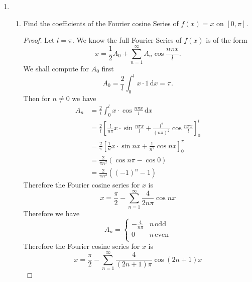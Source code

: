 \documentclass[12pt,letterpaper]{article}
\begin{document}
\begin{enumerate}
\begin{proof}[Solution]
	\end{proof} 
	\newpage
	\item \begin{enumerate}
		\item Find the coefficients of the Fourier cosine Series of $f(x) = x$ on $[0,\pi]$.
		\begin{proof}
			Let $l = \pi$. We know the full Fourier Series of $f(x)$ is of the form
			\[ x = \frac 12 A_0 + \sum_{n = 1}^\infty A_n \cos \frac{n \pi x}{l}.\]
			We shall compute for $A_0$ first
			\[ A_0 = \frac 2l \int_0^l x \cdot 1 \, \mathrm{d}x = \pi.\]
			Then for $n \neq 0$ we have
			\begin{align*}
				A_n &= \frac 2l \int_0^l x \cdot \cos \frac{n \pi x}{l} \, \mathrm{d}x \\
				&= \frac 2l \left[ \frac{l}{n \pi} x \cdot \sin \frac{n \pi x}{l} + \frac{l^2}{(n\pi)^2} \cos \frac{n \pi x}{l}  \right]_0^l \\
				&= \frac 2\pi \left[ \frac 1nx \cdot \sin nx + \frac 1{n^2} \cos nx \right]_0^\pi \\
				&= \frac{2}{\pi n^2}  \left( \cos n \pi - \cos 0 \right) \\
				&= \frac{2}{\pi n^2} ((-1)^n - 1)
			\end{align*}
			Therefore the Fourier cosine series for $x$ is
			\[x = \frac \pi 2  - \sum_{n=1}^{\infty} \frac{4}{2n \pi} \cos n x\]
			Therefore we have
			\[A_n = \left\{ \begin{array}{ll} 
				-\frac{4}{n\pi} & n \, \mathrm{odd} \\
				0 & n \, \mathrm{even} \\
			\end{array} \right. \]
			Therefore the Fourier cosine series for $x$ is 
			\[ x = \frac \pi 2 - \sum_{n=1}^{\infty} \frac{4}{(2n + 1)\pi} \cos(2n +1) x\]
			

\end{proof}
\end{enumerate}
\end{enumerate}
\end{document}
